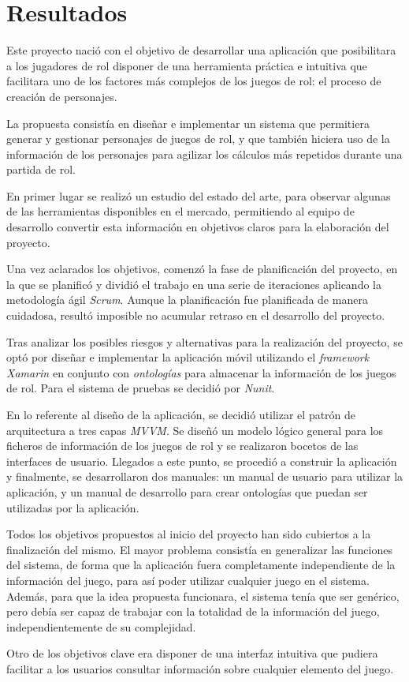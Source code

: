 
\section{Resultados}
Este proyecto nació con el objetivo de desarrollar una aplicación que posibilitara a los jugadores de rol 
disponer de una herramienta práctica e intuitiva que facilitara uno de los factores más complejos de los 
juegos de rol: el proceso de creación de personajes. \medskip 

La propuesta consistía en diseñar e implementar un sistema que permitiera generar y gestionar personajes de juegos de rol, 
y que también hiciera uso de la información de los personajes para agilizar los cálculos más repetidos 
durante una partida de rol. \medskip

En primer lugar se realizó un estudio del estado del arte, para observar algunas de las herramientas disponibles en el mercado, 
permitiendo al equipo de desarrollo convertir esta información en objetivos claros para la elaboración del proyecto.\medskip

Una vez aclarados los objetivos, comenzó la fase de planificación del proyecto, en la que se planificó y dividió el trabajo en 
una serie de iteraciones aplicando la metodología ágil \textit{Scrum}. Aunque la planificación fue planificada de manera cuidadosa, 
resultó imposible no acumular retraso en el desarrollo del proyecto.\medskip

Tras analizar los posibles riesgos y alternativas para la realización del proyecto, se optó por diseñar e implementar la aplicación 
móvil utilizando el \textit{framework Xamarin} en conjunto con \textit{ontologías} para almacenar la información de los juegos de rol.
Para el sistema de pruebas se decidió por \textit{Nunit}. 

En lo referente al diseño de la aplicación, se decidió utilizar el patrón de arquitectura a tres capas \textit{MVVM}. 
Se diseñó un modelo lógico general para los ficheros de información de los juegos de rol y se realizaron bocetos de 
las interfaces de usuario. Llegados a este punto, se procedió a construir la aplicación y finalmente, se desarrollaron 
dos manuales: un manual de usuario para utilizar la aplicación, y un manual de desarrollo para crear ontologías que 
puedan ser utilizadas por la aplicación.\medskip 

Todos los objetivos propuestos al inicio del proyecto han sido cubiertos a la finalización del mismo. El mayor problema 
consistía en generalizar las funciones del sistema, de forma que la aplicación fuera completamente independiente de la 
información del juego, para así poder utilizar cualquier juego en el sistema. Además, para que la idea propuesta funcionara, el 
sistema tenía que ser genérico, pero debía ser capaz de trabajar con la totalidad de la información del juego, independientemente 
de su complejidad. \medskip 

Otro de los objetivos clave era disponer de una interfaz intuitiva que pudiera facilitar a los usuarios consultar información sobre 
cualquier elemento del juego.
